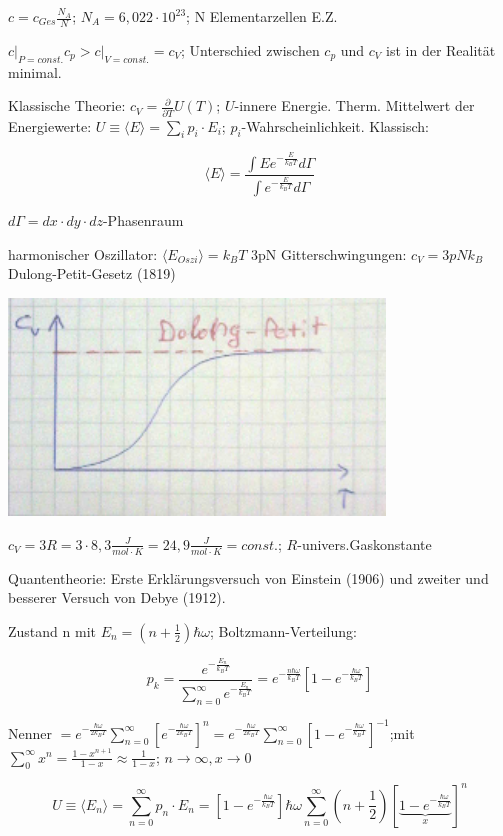 \( c=c_{Ges} \frac{N_A}{N}\); \(N_A = 6,022\cdot 10^{23}\); N Elementarzellen E.Z.

\(\left. c\right|_{P=const.}c_p>\left. c\right|_{V=const.}=c_V\); Unterschied zwischen \(c_p\) und \(c_V\) ist in der Realität minimal.

Klassische Theorie: \(c_V = \frac{\partial}{\partial T} U(T)\); \(U\)-innere Energie. Therm. Mittelwert der Energiewerte: \(U\equiv \langle E \rangle = \sum_i p_i\cdot E_i\); \(p_i\)-Wahrscheinlichkeit. Klassisch:

\[ \langle E\rangle = \frac{\int E e^{-\frac{E}{k_B T}}d\Gamma}{\int e^{-\frac{E}{k_B T}}d\Gamma}\]

\(d\Gamma=dx\cdot dy\cdot dz\)-Phasenraum

harmonischer Oszillator: \(\langle E_{Oszi} \rangle = k_B T\)
3pN Gitterschwingungen: \(c_V = 3pNk_B\) Dulong-Petit-Gesetz (1819)

\includegraphics[width=0.75\textwidth]{kap06_13.png}

\(c_V=3R=3\cdot 8,3\frac{J}{mol\cdot K} = 24,9\frac{J}{mol\cdot K} = const.\); \(R\)-univers.Gaskonstante

Quantentheorie: Erste Erklärungsversuch von Einstein (1906) und zweiter und besserer Versuch von Debye (1912). 

Zustand n mit \(E_n=(n+\frac{1}{2})\hbar \omega\); Boltzmann-Verteilung:

\[ p_k=\frac{e^{-\frac{E_n}{k_B T}}}{\sum^\infty_{n=0} e^{-\frac{E_n}{k_B T}}} = e^{-\frac{n \hbar \omega}{k_BT}}\left[1- e^{-\frac{\hbar \omega}{k_BT}}\right]\]


Nenner \(=e^{-\frac{\hbar \omega}{2k_BT}}\sum^\infty_{n=0} \left[e^{-\frac{\hbar \omega}{2k_BT}}\right]^n= e^{-\frac{\hbar \omega}{2k_BT}}\sum^\infty_{n=0} \left[1- e^{-\frac{\hbar \omega}{k_BT}}\right]^{-1}\);mit  \(\sum^\infty_0 x^n = \frac{1-x^{n+1}}{1-x}\approx \frac{1}{1-x}\); \(n\rightarrow \infty,x\rightarrow 0\)


\[ U \equiv \langle E_n \rangle = \sum^\infty_{n=0} p_n\cdot E_n = \left[1- e^{-\frac{\hbar \omega}{k_BT}}\right]\hbar \omega \sum^\infty_{n=0}(n+\frac{1}{2})\left[\underbrace{1- e^{-\frac{\hbar \omega}{k_BT}}}_{x}\right]^n\]

